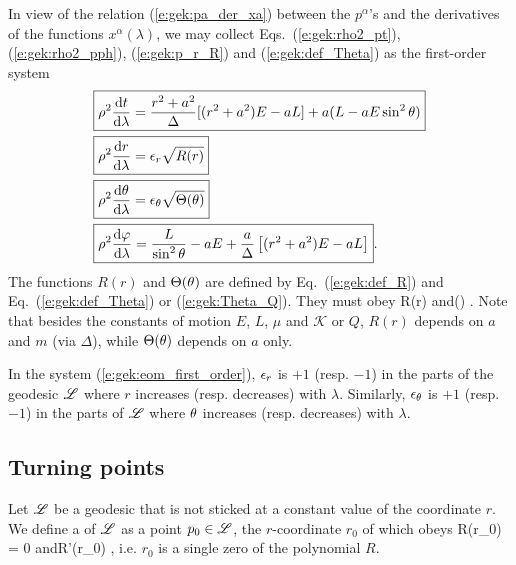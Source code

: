 In view of the relation (\ref{e:gek:pa_der_xa}) between the $p^\alpha$'s
and the derivatives of the functions $x^\alpha(\lambda)$, we may
collect Eqs.~(\ref{e:gek:rho2_pt}), (\ref{e:gek:rho2_pph}), (\ref{e:gek:p_r_R})
and (\ref{e:gek:def_Theta}) as the first-order system
\begin{subequations}
\label{e:gek:eom_first_order}
\begin{align}
& \fbox{$\displaystyle  \rho^2 \frac{\mathrm{d} t}{\mathrm{d} \lambda} = \frac{r^2 + a^2}{\Delta} [(r^2 + a^2) E - a L] + a ( L - a E \sin^2\theta ) $} \label{e:gek:dtdl} \\
& \fbox{$\displaystyle  \rho^2 \frac{\mathrm{d} r}{\mathrm{d} \lambda} = \epsilon_r \sqrt{ R(r) } $} \label{e:gek:drdl}\\
& \fbox{$\displaystyle  \rho^2 \frac{\mathrm{d} \theta}{\mathrm{d} \lambda} = \epsilon_\theta \sqrt{\Theta(\theta)} $} \label{e:gek:dthdl}\\
& \fbox{$\displaystyle  \rho^2 \frac{\mathrm{d} \varphi}{\mathrm{d} \lambda}  = \frac{L}{\sin^2\theta} - a E
    + \frac{a}{\Delta}\left[(r^2 + a^2) E - a L\right] $} . \label{e:gek:dphdl}
\end{align}
\end{subequations}
The functions $R(r)$ and $\Theta(\theta)$ are defined by Eq.~(\ref{e:gek:def_R})
and Eq.~(\ref{e:gek:def_Theta}) or (\ref{e:gek:Theta_Q}). They must obey
\be \label{e:gek:R_Theta_positive}
    R(r)  \qquad\mbox{and}\qquad \Theta(\th)  .
\ee
Note that besides the constants of motion $E$, $L$, $\mu$ and $\mathscr{K}$
or $Q$, $R(r)$ depends on $a$ and $m$ (via $\Delta$), while $\Theta(\theta)$
depends on $a$ only.

In the system (\ref{e:gek:eom_first_order}), $\epsilon_r$
is $+1$ (resp. $-1$) in the parts of the geodesic $\mathscr{L}$ where $r$ increases
(resp. decreases) with $\lambda$. Similarly, $\epsilon_\theta$
is $+1$ (resp. $-1$) in the parts of $\mathscr{L}$ where $\theta$ increases
(resp. decreases) with $\lambda$.

\subsection{Turning points}

Let $\mathscr{L}$ be a geodesic that is not sticked at a constant value of the
coordinate $r$.
We define a  of $\mathscr{L}$ as a point $p_0\in\mathscr{L}$, the $r$-coordinate $r_0$ of which obeys
\be \label{e:gek:def_r_turning}
    R(r_0) = 0 \quad\mbox{and}\quad R'(r_0)  ,
\ee
i.e. $r_0$ is a single zero of the polynomial $R$.

